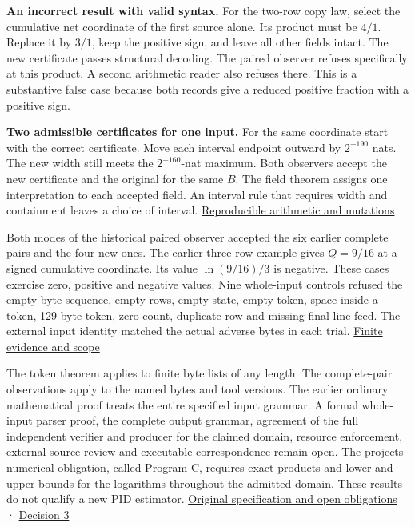 \textbf{An incorrect result with valid syntax.} For the two-row copy law, select the cumulative net coordinate of the first source alone. Its product must be \(4/1\). Replace it by \(3/1\), keep the positive sign, and leave all other fields intact. The new certificate passes structural decoding. The paired observer refuses specifically at this product. A second arithmetic reader also refuses there. This is a substantive false case because both records give a reduced positive fraction with a positive sign.

\textbf{Two admissible certificates for one input.} For the same coordinate start with the correct certificate. Move each interval endpoint outward by \(2^{-190}\) nats. The new width still meets the \(2^{-160}\)-nat maximum. Both observers accept the new certificate and the original for the same \(B\). The field theorem assigns one interpretation to each accepted field. An interval rule that requires width and containment leaves a choice of interval. \href{https://github.com/sepahead/pid-rs/blob/main/audit/research/categorical-state-token/finite.py}{Reproducible arithmetic and mutations}

Both modes of the historical paired observer accepted the six earlier complete pairs and the four new ones. The earlier three-row example gives \(Q=9/16\) at a signed cumulative coordinate. Its value \(\ln(9/16)/3\) is negative. These cases exercise zero, positive and negative values. Nine whole-input controls refused the empty byte sequence, empty rows, empty state, empty token, space inside a token, 129-byte token, zero count, duplicate row and missing final line feed. The external input identity matched the actual adverse bytes in each trial. \href{https://github.com/sepahead/pid-rs/blob/main/audit/research/categorical-state-token/EVIDENCE.md}{Finite evidence and scope}

The token theorem applies to finite byte lists of any length. The complete-pair observations apply to the named bytes and tool versions. The earlier ordinary mathematical proof treats the entire specified input grammar. A formal whole-input parser proof, the complete output grammar, agreement of the full independent verifier and producer for the claimed domain, resource enforcement, external source review and executable correspondence remain open. The project\textquotesingle s numerical obligation, called Program C, requires exact products and lower and upper bounds for the logarithms throughout the admitted domain. These results do not qualify a new PID estimator. \href{https://github.com/sepahead/pid-rs/blob/main/claims/SX-CERTIFIED-AVERAGED-PID3-001/obligations.md}{Original specification and open obligations} · \href{https://github.com/sepahead/pid-rs/blob/main/claims/SX-CERTIFIED-AVERAGED-PID3-001/decision-v3.md}{Decision 3}

